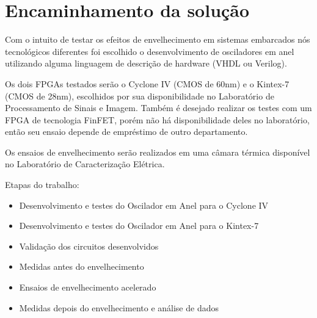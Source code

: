 \chapter{Encaminhamento da solução}

Com o intuito de testar os efeitos de envelhecimento em sistemas embarcados nós tecnológicos diferentes foi escolhido o desenvolvimento de osciladores em anel utilizando alguma linguagem de descrição de hardware (VHDL ou Verilog).

Os dois FPGAs testados serão o Cyclone IV (CMOS de 60nm) e o Kintex-7 (CMOS de 28nm), escolhidos por sua disponibilidade no Laboratório de Processamento de Sinais e Imagem. Também é desejado realizar os testes com um FPGA de tecnologia FinFET, porém não há disponibilidade deles no laboratório, então seu ensaio depende de empréstimo de outro departamento.

Os ensaios de envelhecimento serão realizados em uma câmara térmica disponível no Laboratório de Caracterização Elétrica.

Etapas do trabalho:
\begin{itemize}
    \item Desenvolvimento e testes do Oscilador em Anel para o Cyclone IV
    \item Desenvolvimento e testes do Oscilador em Anel para o Kintex-7
    \item Validação dos circuitos desenvolvidos
    \item Medidas antes do envelhecimento
    \item Ensaios de envelhecimento acelerado
    \item Medidas depois do envelhecimento e análise de dados
\end{itemize}

